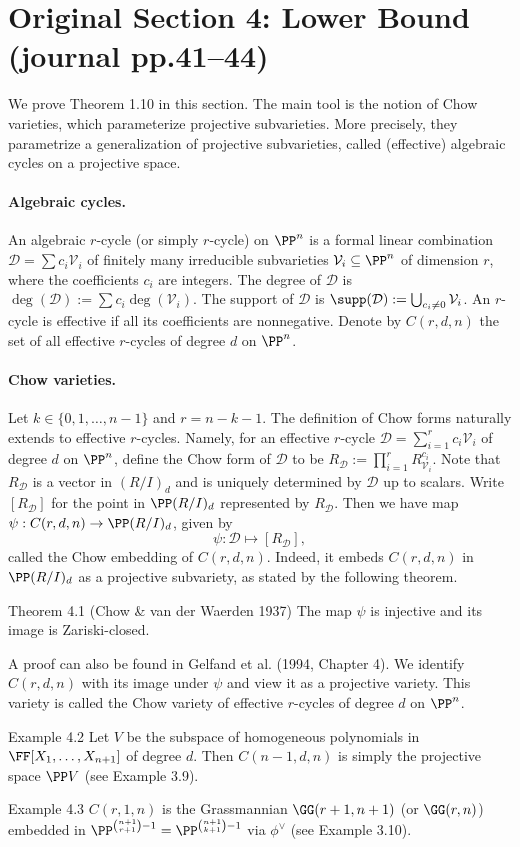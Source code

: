 \section*{Original Section 4: Lower Bound (journal pp.41--44)}
We prove Theorem 1.10 in this section. The main tool is the notion of Chow varieties, which parameterize projective subvarieties. More precisely, they parametrize a generalization of projective subvarieties, called (effective) algebraic cycles on a projective space.
\paragraph{Algebraic cycles.}
An algebraic $r$-cycle (or simply $r$-cycle) on $\PP^n$ is a formal linear combination $\mathcal D=\sum c_i\mathcal V_i$ of finitely many irreducible subvarieties $\mathcal V_i\subseteq\PP^n$ of dimension $r$, where the coefficients $c_i$ are integers. The degree of $\mathcal D$ is $\deg(\mathcal D):=\sum c_i\deg(\mathcal V_i)$. The support of $\mathcal D$ is $\supp(\mathcal D):=\bigcup_{c_i\ne0}\mathcal V_i$. An $r$-cycle is effective if all its coefficients are nonnegative. Denote by $C(r,d,n)$ the set of all effective $r$-cycles of degree $d$ on $\PP^n$.
\paragraph{Chow varieties.}
Let $k\in\{0,1,\ldots,n-1\}$ and $r=n-k-1$. The definition of Chow forms naturally extends to effective $r$-cycles. Namely, for an effective $r$-cycle $\mathcal D=\sum_{i=1}^r c_i\mathcal V_i$ of degree $d$ on $\PP^n$, define the Chow form of $\mathcal D$ to be $R_{\mathcal D}:=\prod_{i=1}^r R_{\mathcal V_i}^{c_i}$.
Note that $R_{\mathcal D}$ is a vector in $(R/I)_d$ and is uniquely determined by $\mathcal D$ up to scalars. Write $[R_{\mathcal D}]$ for the point in $\PP(R/I)_d$ represented by $R_{\mathcal D}$. Then we have map $\psi:C(r,d,n)\to\PP(R/I)_d$, given by
\[\psi:\mathcal D\mapsto[R_{\mathcal D}],\]
called the Chow embedding of $C(r,d,n)$. Indeed, it embeds $C(r,d,n)$ in $\PP(R/I)_d$ as a projective subvariety, as stated by the following theorem.
\begin{result}{Theorem 4.1 (Chow \& van der Waerden 1937)}
The map $\psi$ is injective and its image is Zariski-closed.
\end{result}
A proof can also be found in Gelfand et al. (1994, Chapter 4). We identify $C(r,d,n)$ with its image under $\psi$ and view it as a projective variety. This variety is called the Chow variety of effective $r$-cycles of degree $d$ on $\PP^n$.
\begin{result}{Example 4.2}
Let $V$ be the subspace of homogeneous polynomials in $\FF[X_1,\ldots,X_{n+1}]$ of degree $d$. Then $C(n-1,d,n)$ is simply the projective space $\PP V$ (see Example 3.9).
\end{result}
\begin{result}{Example 4.3}
$C(r,1,n)$ is the Grassmannian $\GG(r+1,n+1)$ (or $\GG(r,n)$) embedded in $\PP^{\binom{n+1}{r+1}-1}=\PP^{\binom{n+1}{k+1}-1}$ via $\phi^\vee$ (see Example 3.10).
\end{result}
